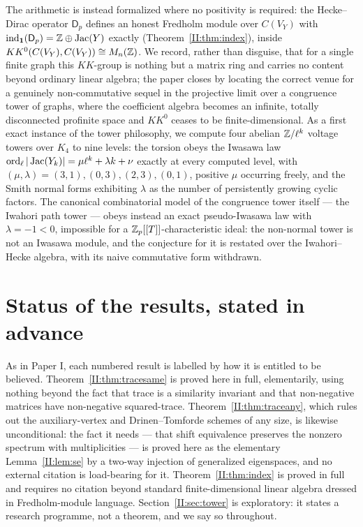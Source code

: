 \begin{chapterabstract}
The arithmetic is instead formalized where no positivity is required: the Hecke--Dirac
operator $\mathsf D_p$ defines an honest Fredholm module over $C(V_Y)$ with
$\operatorname{ind}_{\mathbf1}(\mathsf D_p)=\mathbb{Z}\oplus\operatorname{Jac}(Y)$ exactly (Theorem~\ref{II:thm:index}), inside
$KK^0(C(V_Y),C(V_Y))\cong M_n(\mathbb{Z})$. We record, rather than disguise, that for a single
finite graph this $KK$-group is nothing but a matrix ring and carries no content beyond
ordinary linear algebra; the paper closes by locating the correct venue for a genuinely
non-commutative sequel in the projective limit over a congruence tower of graphs, where
the coefficient algebra becomes an infinite, totally disconnected profinite space and
$KK^0$ ceases to be finite-dimensional. As a first exact instance of the tower
philosophy, we compute four abelian $\mathbb{Z}/\ell^k$ voltage towers over $K_4$ to nine levels:
the torsion obeys the Iwasawa law $\operatorname{ord}_\ell|\operatorname{Jac}(Y_k)|=\mu\ell^k+\lambda
k+\nu$ exactly at every computed level, with $(\mu,\lambda)=(3,1),(0,3),(2,3),(0,1)$,
positive $\mu$ occurring freely, and the Smith normal forms exhibiting $\lambda$ as the
number of persistently growing cyclic factors. The canonical combinatorial model of the
congruence tower itself --- the Iwahori path tower --- obeys instead an exact
pseudo-Iwasawa law with $\lambda=-1<0$, impossible for a $\mathbb{Z}_p[[T]]$-characteristic
ideal: the non-normal tower is not an Iwasawa module, and the conjecture for it is
restated over the Iwahori--Hecke algebra, with its naive commutative form withdrawn.
\end{chapterabstract}

\section*{Status of the results, stated in advance}

As in Paper I, each numbered result is labelled by how it is entitled to be believed.
Theorem~\ref{II:thm:tracesame} is proved here in full, elementarily, using nothing beyond
the fact that trace is a similarity invariant and that non-negative matrices have
non-negative squared-trace. Theorem~\ref{II:thm:traceany}, which rules out the auxiliary-vertex and Drinen--Tomforde
schemes of any size, is likewise unconditional: the fact it needs --- that shift
equivalence preserves the nonzero spectrum with multiplicities --- is proved here as the
elementary Lemma~\ref{II:lem:se} by a two-way injection of generalized eigenspaces, and no
external citation is load-bearing for it. Theorem~\ref{II:thm:index} is proved in
full and requires no citation beyond standard finite-dimensional linear algebra dressed
in Fredholm-module language. Section~\ref{II:sec:tower} is exploratory: it states a
research programme, not a theorem, and we say so throughout.

